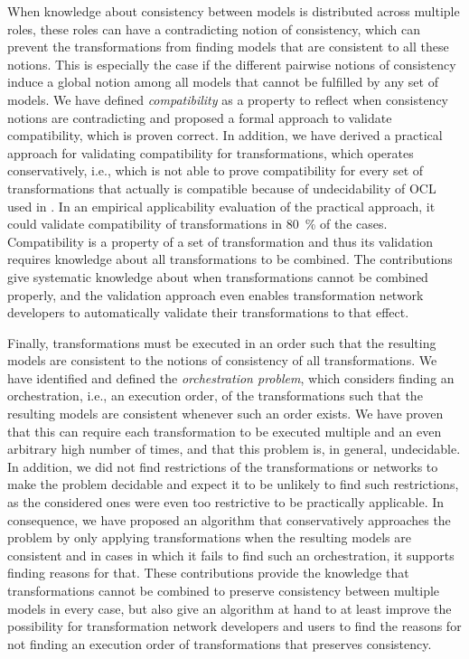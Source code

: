 When knowledge about consistency between models is distributed across multiple roles, these roles can have a contradicting notion of consistency, which can prevent the transformations from finding models that are consistent to all these notions.
This is especially the case if the different pairwise notions of consistency induce a global notion among all models that cannot be fulfilled by any set of models.
We have defined \emph{compatibility} as a property to reflect when consistency notions are contradicting and proposed a formal approach to validate compatibility, which is proven correct.
In addition, we have derived a practical approach for validating compatibility for \qvtr transformations, which operates conservatively, i.e., which is not able to prove compatibility for every set of transformations that actually is compatible because of undecidability of \gls{OCL} used in \qvtr.
In an empirical applicability evaluation of the practical approach, it could validate compatibility of transformations in \SI{80}{\percent} of the cases.
Compatibility is a property of a set of transformation and thus its validation requires knowledge about all transformations to be combined.
The contributions give systematic knowledge about when transformations cannot be combined properly, and the validation approach even enables transformation network developers to automatically validate their transformations to that effect.

Finally, transformations must be executed in an order such that the resulting models are consistent to the notions of consistency of all transformations.
We have identified and defined the \emph{orchestration problem}, which considers finding an orchestration, i.e., an execution order, of the transformations such that the resulting models are consistent whenever such an order exists.
We have proven that this can require each transformation to be executed multiple and an even arbitrary high number of times, and that this problem is, in general, undecidable.
In addition, we did not find restrictions of the transformations or networks to make the problem decidable and expect it to be unlikely to find such restrictions, as the considered ones were even too restrictive to be practically applicable.
In consequence, we have proposed an algorithm that conservatively approaches the problem by only applying transformations when the resulting models are consistent and in cases in which it fails to find such an orchestration, it supports finding reasons for that.
These contributions provide the knowledge that transformations cannot be combined to preserve consistency between multiple models in every case, but also give an algorithm at hand to at least improve the possibility for transformation network developers and users to find the reasons for not finding an execution order of transformations that preserves consistency.

